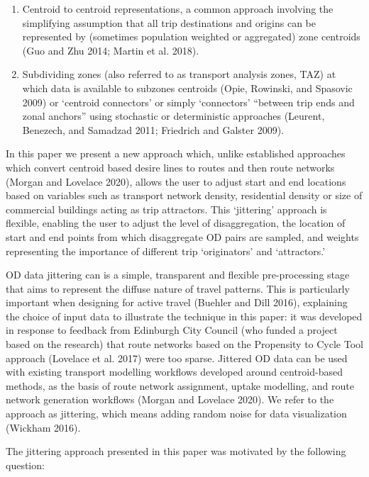 \documentclass[
]{article}
\providecommand{\tightlist}{%
  \setlength{\itemsep}{0pt}\setlength{\parskip}{0pt}}
\begin{document}
\begin{enumerate}
\def\labelenumi{\arabic{enumi}.}
\tightlist
\item
  Centroid to centroid representations, a common approach involving the simplifying assumption that all trip destinations and origins can be represented by (sometimes population weighted or aggregated) zone centroids (Guo and Zhu 2014; Martin et al. 2018).
\item
  Subdividing zones (also referred to as transport analysis zones, TAZ) at which data is available to subzones centroids (Opie, Rowinski, and Spasovic 2009) or `centroid connectors' or simply `connectors' ``between trip ends and zonal anchors'' using stochastic or deterministic approaches (Leurent, Benezech, and Samadzad 2011; Friedrich and Galster 2009).
\end{enumerate}

In this paper we present a new approach which, unlike established approaches which convert centroid based desire lines to routes and then route networks (Morgan and Lovelace 2020), allows the user to adjust start and end locations based on variables such as transport network density, residential density or size of commercial buildings acting as trip attractors.
This `jittering' approach is flexible, enabling the user to adjust the level of disaggregation, the location of start and end points from which disaggregate OD pairs are sampled, and weights representing the importance of different trip `originators' and `attractors.'

OD data jittering can is a simple, transparent and flexible pre-processing stage that aims to represent the diffuse nature of travel patterns.
This is particularly important when designing for active travel (Buehler and Dill 2016), explaining the choice of input data to illustrate the technique in this paper: it was developed in response to feedback from Edinburgh City Council (who funded a project based on the research) that route networks based on the Propensity to Cycle Tool approach (Lovelace et al. 2017) were too sparse.
Jittered OD data can be used with existing transport modelling workflows developed around centroid-based methods, as the basis of route network assignment, uptake modelling, and route network generation workflows (Morgan and Lovelace 2020).
We refer to the approach as jittering, which means adding random noise for data visualization (Wickham 2016).

The jittering approach presented in this paper was motivated by the following question:
\end{document}
